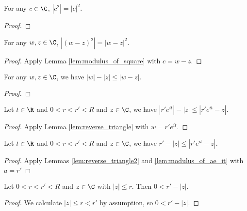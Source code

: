 
\begin{lemma}\label{lem:modulus_of_square} \leanok
For any $c \in \C$, $|c^2| = |c|^2$.
\end{lemma}
\begin{proof}\leanok
\end{proof}


\begin{lemma}\label{lem:modulus_wz} \leanok
For any $w,z \in \C$, $|(w-z)^2| = |w-z|^2$.
\end{lemma}
\begin{proof}\leanok
{}
Apply Lemma \ref{lem:modulus_of_square} with $c=w-z$.
\end{proof}


\begin{lemma} \label{lem:reverse_triangle} \leanok
For any $w, z\in \C$, we have $|w|-|z| \le |w-z|$.
\end{lemma}
\begin{proof}\leanok
\end{proof}


\begin{lemma} \label{lem:reverse_triangle2} \leanok
Let $t\in\R$ and $0 < r < r' < R$ and $z\in\C$, we have $|r'e^{it}|-|z| \le |r'e^{it}-z|$.
\end{lemma}
\begin{proof}\leanok
{}
Apply Lemma \ref{lem:reverse_triangle} with $w=r'e^{it}$.
\end{proof}


\begin{lemma} \label{lem:reverse_triangle3} \leanok
Let $t\in\R$ and $0 < r < r' < R$ and $z\in\C$, we have $r' -|z| \le |r'e^{it}-z|$.
\end{lemma}
\begin{proof}\leanok
{}
Apply Lemmas \ref{lem:reverse_triangle2} and \ref{lem:modulus_of_ae_it} with $a=r'$
\end{proof}


\begin{lemma} \label{lem:zrr1} \leanok
Let $0 < r < r' < R$ and $z\in\C$ with $|z|\le r$. Then $0<r' - |z|$.
\end{lemma}
\begin{proof}\leanok
We calculate $|z| \le r < r'$ by assumption, so $0 < r' - |z|$.
\end{proof}

